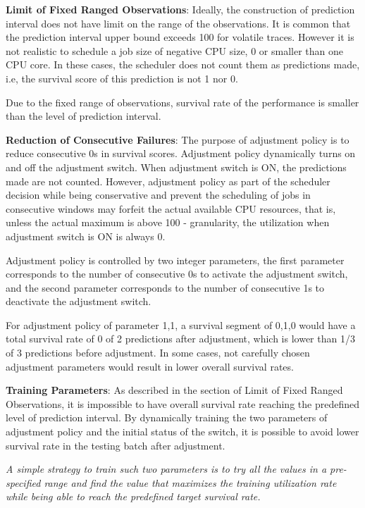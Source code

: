 \documentclass{article}
\begin{document}
\begin{flushleft}
\textbf{Limit of Fixed Ranged Observations}: Ideally, the construction of prediction interval does not have limit on the range of the observations. It is common that the prediction interval upper bound exceeds 100 for volatile traces. However it is not realistic to schedule a job size of negative CPU size, 0 or smaller than one CPU core. In these cases, the scheduler does not count them as predictions made, i.e, the survival score of this prediction is not 1 nor 0.

Due to the fixed range of observations, survival rate of the performance is smaller than the level of prediction interval.
\end{flushleft}

\begin{flushleft}
\textbf{Reduction of Consecutive Failures}: The purpose of adjustment policy is to reduce consecutive 0s in survival scores. Adjustment policy dynamically turns on and off the adjustment switch. When adjustment switch is ON, the predictions made are not counted. However, adjustment policy as part of the scheduler decision while being conservative and prevent the scheduling of jobs in consecutive windows may forfeit the actual available CPU resources, that is, unless the actual maximum is above 100 - granularity, the utilization when adjustment switch is ON is always 0.

Adjustment policy is controlled by two integer parameters, the first parameter corresponds to the number of consecutive 0s to activate the adjustment switch, and the second parameter corresponds to the number of consecutive 1s to deactivate the adjustment switch.

For adjustment policy of parameter 1,1, a survival segment of 0,1,0 would have a total survival rate of 0 of 2 predictions after adjustment, which is lower than 1/3 of 3 predictions before adjustment. In some cases, not carefully chosen adjustment parameters would result in lower overall survival rates. 
\end{flushleft}

\begin{flushleft}
\textbf{Training Parameters}: As described in the section of Limit of Fixed Ranged Observations, it is impossible to have overall survival rate reaching the predefined level of prediction interval. By dynamically training the two parameters of adjustment policy and the initial status of the switch, it is possible to avoid lower survival rate in the testing batch after adjustment.

\textit{A simple strategy to train such two parameters is to try all the values in a pre-specified range and find the value that maximizes the training utilization rate while being able to reach the predefined target survival rate.}
\end{flushleft}
\end{document}
